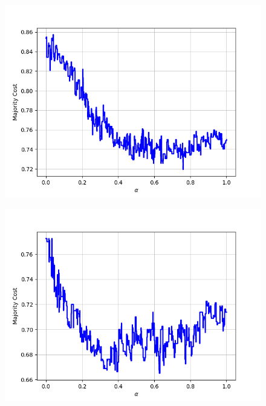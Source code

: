 \begin{figure}[h]
\begin{minipage}{.19\textwidth}
\end{minipage}
\begin{minipage}{.19\textwidth}
  \centering
  {\includegraphics[width=\linewidth]{plots/omniglot-intra-ac/Arcadian}}
\end{minipage}
\begin{minipage}{.19\textwidth}
  \centering
  {\includegraphics[width=\linewidth]{plots/omniglot-intra-ac/Armenian}}
\end{minipage}
\begin{minipage}{.19\textwidth}
  \centering

\end{minipage}
\end{figure}
